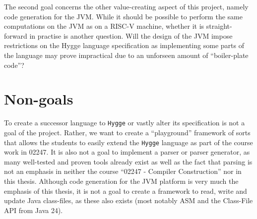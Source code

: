The second goal concerns the other value-creating aspect of this project, namely code generation for the JVM. While it should be possible to perform the same computations on the JVM
as on a RISC-V machine, whether it is straight-forward in practise is another question. Will the design of the JVM impose restrictions on the Hygge language specification as
implementing some parts of the language may prove impractical due to an unforseen amount of ``boiler-plate code''?

\section{Non-goals}

To create a successor language to \texttt{Hygge} or vastly alter its specification is not a goal of the project. Rather, we want to create a
``playground'' framework of sorts that allows the students to easily extend the \texttt{Hygge} language as part of the course work in 02247. 
It is also not a goal to implement a parser or parser generator, as many well-tested and proven tools already exist as well as the fact that
parsing is not an emphasis in neither the course ``02247 - Compiler Construction'' nor in this thesis. Although code generation for the JVM platform
is very much the emphasis of this thesis, it is not a goal to create a framework to read, write and update Java class-files, as these also exists 
(most notably ASM and the Class-File API from Java 24).
